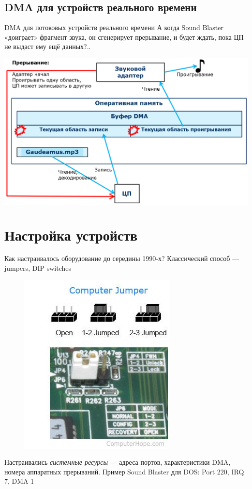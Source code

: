 \documentclass[xetex,aspectratio=43]{beamer}
\begin{document}
\subsection{DMA для устройств реального времени}

\begin{frame}{DMA для потоковых устройств реального времени}
	А когда Sound Blaster «доиграет» фрагмент звука, он сгенерирует
	прерывание, и будет ждать, пока ЦП не выдаст ему ещё данных?..
	
	\pause
	
	\includegraphics{img/03.interrupt_DMA.png}
	
\end{frame}

\section{Настройка устройств}

\begin{frame}{Как настраивалось оборудование до середины 1990-х?}
	Классический способ --- jumpers, DIP switches
	
	\begin{figure}
		\centering
		\includegraphics[height=0.5\textheight]{img/03.jumper.jpg}
	\end{figure}
	
	Настраивались \emph{системные ресурсы} --- адреса портов, характеристики DMA, номера аппаратных прерываний. Пример Sound Blaster для DOS: Port 220, IRQ 7, DMA 1
\end{frame}
\end{document}
